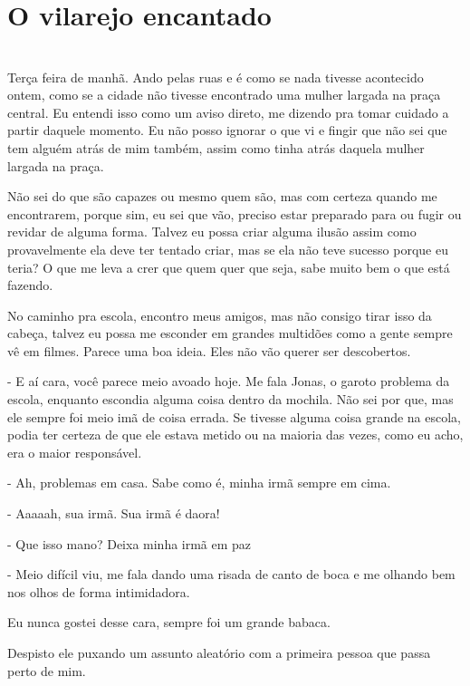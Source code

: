 
\newpage


\ifdefined\useChapters
\chapter{O vilarejo encantado}
\else
\chapter{}
\fi
Terça feira de manhã. Ando pelas ruas e é como se nada tivesse acontecido ontem, como se a cidade não tivesse encontrado uma mulher largada na praça central. Eu entendi isso como um aviso direto, me dizendo pra tomar cuidado a partir daquele momento. Eu não posso ignorar o que vi e fingir que não sei que tem alguém atrás de mim também, assim como tinha atrás daquela mulher largada na praça. 

Não sei do que são capazes ou mesmo quem são, mas com certeza quando me encontrarem, porque sim, eu sei que vão, preciso estar preparado para ou fugir ou revidar de alguma forma. Talvez eu possa criar alguma ilusão assim como provavelmente ela deve ter tentado criar, mas se ela não teve sucesso porque eu teria? O que me leva a crer que quem quer que seja, sabe muito bem o que está fazendo.

No caminho pra escola, encontro meus amigos, mas não consigo tirar isso da cabeça, talvez eu possa me esconder em grandes multidões como a gente sempre vê em filmes. Parece uma boa ideia. Eles não vão querer ser descobertos.

- E aí cara, você parece meio avoado hoje. Me fala Jonas, o garoto problema da escola, enquanto escondia alguma coisa dentro da mochila. Não sei por que, mas ele sempre foi meio imã de coisa errada. Se tivesse alguma coisa grande na escola, podia ter certeza de que ele estava metido ou na maioria das vezes, como eu acho, era o maior responsável.

- Ah, problemas em casa. Sabe como é, minha irmã sempre em cima.

- Aaaaah, sua irmã. Sua irmã é daora!

- Que isso mano? Deixa minha irmã em paz

- Meio difícil viu, me fala dando uma risada de canto de boca e me olhando bem nos olhos de forma intimidadora.

Eu nunca gostei desse cara, sempre foi um grande babaca.

Despisto ele puxando um assunto aleatório com a primeira pessoa que passa perto de mim.

